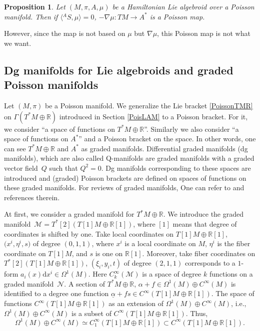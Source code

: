 \documentclass[pdftex]{sigma}
\numberwithin{equation}{section}
\newtheorem{Proposition}[Theorem]{Proposition}
 { \theoremstyle{definition}
\newtheorem{Definition}[Theorem]{Definition}
\newtheorem{Note}[Theorem]{Note}
\newtheorem{Example}[Theorem]{Example}
\newtheorem{Remark}[Theorem]{Remark}
\newtheorem{Question}[Theorem]{Question}
 }
\def\bR{{\mathbb{R}}}
\newcommand{\calM}{{\mathcal M}}
\newcommand{\calN}{{\mathcal N}}
\newcommand{\rd}{\mathrm{d}}
\newcommand{\ualpha}{{\underline{\alpha}}{}}
\begin{document}
\begin{Proposition}\label{nablamuPoisson}
Let $(M, \pi, A, \mu)$ be a Hamiltonian Lie algebroid over a Poisson manifold.
Then if $\bigl\langle{}^A S,\mu\bigr\rangle =0$,
$-\nabla \mu\colon TM \rightarrow A^*$ is a Poisson map.
\end{Proposition}
However, since the map is not based on $\mu$ but $\nabla \mu$,
this Poisson map is not what we want.


\subsection{Dg manifolds for Lie algebroids and graded Poisson manifolds}

Let $(M, \pi)$ be a Poisson manifold.
We generalize the Lie bracket \eqref{PoissonTMR} on
$\Gamma(T^*M \oplus \bR)$ introduced in Section \ref{PoisLAM}
to a Poisson bracket.
For it, we consider ``a space of functions on $T^*M \oplus \bR$''.
Similarly we also consider ``a space of functions on $A^*$''
and a Poisson bracket on the space.
In other words, one can see $T^*M \oplus \bR$ and $A^*$
as graded manifolds.
Differential graded manifolds (dg manifolds), which are also called Q-manifolds
are graded manifolds with a graded vector field~$Q$ such that $Q^2=0$.
Dg manifolds corresponding to these spaces are introduced and (graded) Poisson brackets are defined on spaces of functions on these graded manifolds.
For reviews of graded manifolds, One can refer to \cite{Cattaneo:2010re, Ikeda:2012pv,
Roytenberg:2006qz} and references therein.

At first, we consider a graded manifold for $T^*M \oplus \bR$.
We introduce the graded manifold~${\calM = T^*[2](T[1]M \oplus \bR[1])}$,
where $[1]$ means that degree of coordinates is shifted by one.
Take local coordinates on $T[1]M \oplus \bR[1]$,
$\bigl(x^i, \eta^i, s\bigr)$ of degree $(0, 1, 1)$, where
$x^i$ is a local coordinate on $M$,
$\eta^i$ is the fiber coordinate on $T[1]M$,
and $s$ is one on $\bR[1]$.
Moreover, take fiber coordinates on
$T^*[2](T[1]M \oplus \bR[1])$, $(\xi_i, y_i, t)$ of degree
$(2, 1, 1)$
corresponds to a $1$-form $a_i(x) \rd x^i \in \Omega^1(M)$.
Here $C_k^{\infty}(\calM)$ is a space of degree $k$ functions on a graded
manifold~$\calN$.
A section of $T^*M \oplus \bR$,
$\alpha + f \in \Omega^1(M) \oplus C^{\infty}(M)$ is identified to
a degree one function
$\ualpha + f s \in C^{\infty}(T[1]M \oplus \bR[1])$.
The space of functions $C^{\infty}(T[1]M \oplus \bR[1])$ as an extension of
$\Omega^1(M) \oplus C^{\infty}(M)$, i.e.,
$\Omega^1(M) \oplus C^{\infty}(M)$ is a subset of
$C^{\infty}(T[1]M \oplus \bR[1])$.
Thus, \[\Omega^1(M) \oplus C^{\infty}(M) \simeq
C_1^{\infty}(T[1]M \oplus \bR[1]) \subset C^{\infty}(T[1]M \oplus \bR[1]).\]
\end{document}
